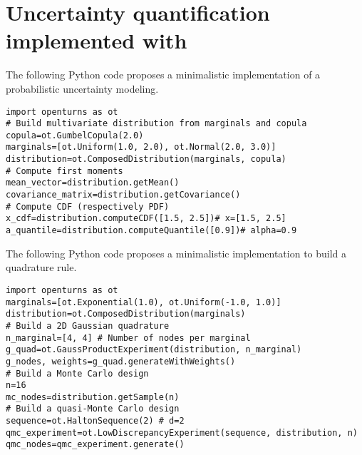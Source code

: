 \chapter{Uncertainty quantification implemented with \ot}
\label{apx:F}



\begin{otexample}
    The following Python code proposes a minimalistic \ot implementation of a probabilistic uncertainty modeling. 
    \lstset{style=mystyle, language=python}
\begin{lstlisting}
import openturns as ot
# Build multivariate distribution from marginals and copula
copula=ot.GumbelCopula(2.0)
marginals=[ot.Uniform(1.0, 2.0), ot.Normal(2.0, 3.0)]
distribution=ot.ComposedDistribution(marginals, copula)
# Compute first moments
mean_vector=distribution.getMean()
covariance_matrix=distribution.getCovariance()
# Compute CDF (respectively PDF)
x_cdf=distribution.computeCDF([1.5, 2.5])# x=[1.5, 2.5]
a_quantile=distribution.computeQuantile([0.9])# alpha=0.9
\end{lstlisting}
\end{otexample}

\begin{otexample}
    The following Python code proposes a minimalistic \ot implementation to build a quadrature rule. 
\lstset{style=mystyle, language=python}
\begin{lstlisting}
import openturns as ot
marginals=[ot.Exponential(1.0), ot.Uniform(-1.0, 1.0)]
distribution=ot.ComposedDistribution(marginals)
# Build a 2D Gaussian quadrature
n_marginal=[4, 4] # Number of nodes per marginal
g_quad=ot.GaussProductExperiment(distribution, n_marginal)
g_nodes, weights=g_quad.generateWithWeights()
# Build a Monte Carlo design
n=16 
mc_nodes=distribution.getSample(n)
# Build a quasi-Monte Carlo design
sequence=ot.HaltonSequence(2) # d=2
qmc_experiment=ot.LowDiscrepancyExperiment(sequence, distribution, n)
qmc_nodes=qmc_experiment.generate()
\end{lstlisting}
\end{otexample}


